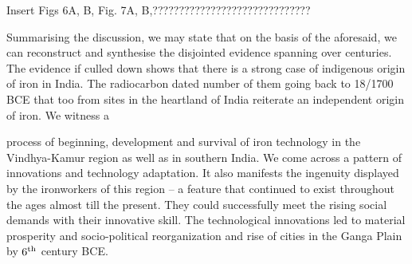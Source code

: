 Insert Figs 6A, B,
Fig. 7A, B,??????????????????????????????


Summarising the discussion, we may state that on the basis of the aforesaid, we can reconstruct and synthesise the disjointed evidence spanning over centuries. The evidence if culled down shows that there is a strong case of indigenous origin of iron in India. The radiocarbon dated number of them going back to 18/1700 BCE that too from sites in the heartland of India reiterate an independent origin of iron. We witness a 

process of beginning, development and survival of iron technology in the Vindhya-Kamur region as well as in southern India. We come across a pattern of innovations and technology adaptation. It also manifests the ingenuity displayed by the ironworkers of this region – a feature that continued to exist throughout the ages almost till the present. They could successfully meet the rising social demands with their innovative skill. The technological innovations led to material prosperity and socio-political reorganization and rise of cities in the Ganga Plain by $6^{\rm th}$ century BCE. 
\newpage
